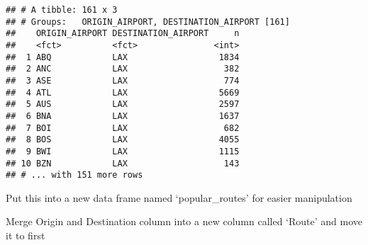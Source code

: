 \documentclass[]{article}
\newenvironment{Shaded}{\begin{snugshade}}{\end{snugshade}}
\newcommand{\DecValTok}[1]{\textcolor[rgb]{0.00,0.00,0.81}{#1}}
\newcommand{\KeywordTok}[1]{\textcolor[rgb]{0.13,0.29,0.53}{\textbf{#1}}}
\newcommand{\NormalTok}[1]{#1}
\newcommand{\OperatorTok}[1]{\textcolor[rgb]{0.81,0.36,0.00}{\textbf{#1}}}
\newcommand{\OtherTok}[1]{\textcolor[rgb]{0.56,0.35,0.01}{#1}}
\newcommand{\StringTok}[1]{\textcolor[rgb]{0.31,0.60,0.02}{#1}}
\begin{document}
\begin{verbatim}
## # A tibble: 161 x 3
## # Groups:   ORIGIN_AIRPORT, DESTINATION_AIRPORT [161]
##    ORIGIN_AIRPORT DESTINATION_AIRPORT     n
##    <fct>          <fct>               <int>
##  1 ABQ            LAX                  1834
##  2 ANC            LAX                   382
##  3 ASE            LAX                   774
##  4 ATL            LAX                  5669
##  5 AUS            LAX                  2597
##  6 BNA            LAX                  1637
##  7 BOI            LAX                   682
##  8 BOS            LAX                  4055
##  9 BWI            LAX                  1115
## 10 BZN            LAX                   143
## # ... with 151 more rows
\end{verbatim}

Put this into a new data frame named `popular\_routes' for easier
manipulation

\begin{Shaded}
\end{Shaded}

Merge Origin and Destination column into a new column called `Route' and
move it to first

\begin{Shaded}
\end{Shaded}
\end{document}
